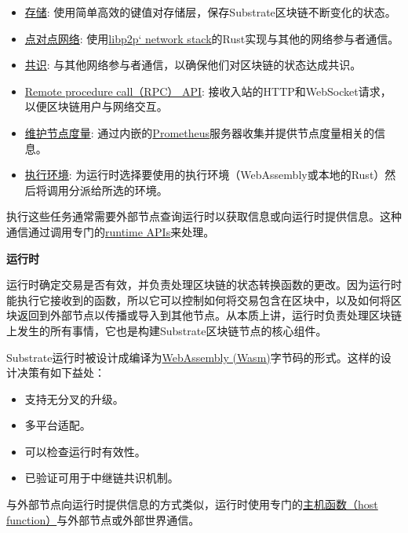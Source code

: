 \begin{itemize}
\item
  \href{/fundamentals/state-transitions-and-storage/}{存储}:
  使用简单高效的键值对存储层，保存Substrate区块链不断变化的状态。
\item
  \href{/fundamentals/node-and-network-types/}{点对点网络}:
  使用\href{https://libp2p.io/}{libp2p` network
  stack}的Rust实现与其他的网络参与者通信。
\item
  \href{/fundamentals/consensus/}{共识}:
  与其他网络参与者通信，以确保他们对区块链的状态达成共识。
\item
  \href{/build/remote-procedure-calls/}{Remote procedure call（RPC）
  API}: 接收入站的HTTP和WebSocket请求，以便区块链用户与网络交互。
\item
  \href{/maintain/monitor/}{维护节点度量}:
  通过内嵌的\href{https://prometheus.io/}{Prometheus}服务器收集并提供节点度量相关的信息。
\item
  \href{/build/build-process/}{执行环境}:
  为运行时选择要使用的执行环境（WebAssembly或本地的Rust）然后将调用分派给所选的环境。
\end{itemize}

执行这些任务通常需要外部节点查询运行时以获取信息或向运行时提供信息。这种通信通过调用专门的\href{/reference/runtime-apis/}{runtime
APIs}来处理。

\hypertarget{ux8fd0ux884cux65f6}{%
\textbf{运行时}\label{ux8fd0ux884cux65f6}}

运行时确定交易是否有效，并负责处理区块链的状态转换函数的更改。因为运行时能执行它接收到的函数，所以它可以控制如何将交易包含在区块中，以及如何将区块返回到外部节点以传播或导入到其他节点。从本质上讲，运行时负责处理区块链上发生的所有事情，它也是构建Substrate区块链节点的核心组件。

Substrate运行时被设计成编译为\href{/reference/glossary\#webassembly-wasm}{WebAssembly
(Wasm)}字节码的形式。这样的设计决策有如下益处：

\begin{itemize}
\item
  支持无分叉的升级。
\item
  多平台适配。
\item
  可以检查运行时有效性。
\item
  已验证可用于中继链共识机制。
\end{itemize}

与外部节点向运行时提供信息的方式类似，运行时使用专门的\href{https://paritytech.github.io/substrate/master/sp_io/index.html}{主机函数（host
function）}与外部节点或外部世界通信。

